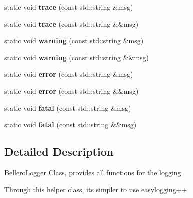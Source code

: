 \begin{DoxyCompactItemize}
$$static void {\bfseries trace} (const std\+::string \&msg)
\item 
\hypertarget{classbellerophon_1_1log_1_1BellerophonLogger_a96aad2634d0c3338abd27f49fbbbe668}{}\label{classbellerophon_1_1log_1_1BellerophonLogger_a96aad2634d0c3338abd27f49fbbbe668} 
static void {\bfseries trace} (const std\+::string \&\&msg)
\item 
\hypertarget{classbellerophon_1_1log_1_1BellerophonLogger_ab7adf7e483d7a4f30a16331a65161efc}{}\label{classbellerophon_1_1log_1_1BellerophonLogger_ab7adf7e483d7a4f30a16331a65161efc} 
static void {\bfseries warning} (const std\+::string \&msg)
\item 
\hypertarget{classbellerophon_1_1log_1_1BellerophonLogger_a5e23b3d06515dc2610660646e6c99f03}{}\label{classbellerophon_1_1log_1_1BellerophonLogger_a5e23b3d06515dc2610660646e6c99f03} 
static void {\bfseries warning} (const std\+::string \&\&msg)
\item 
\hypertarget{classbellerophon_1_1log_1_1BellerophonLogger_a41a6707e911c46c3a78df45730cc6e95}{}\label{classbellerophon_1_1log_1_1BellerophonLogger_a41a6707e911c46c3a78df45730cc6e95} 
static void {\bfseries error} (const std\+::string \&msg)
\item 
\hypertarget{classbellerophon_1_1log_1_1BellerophonLogger_a0586f437126dbc33643e2c71ac1f6b4d}{}\label{classbellerophon_1_1log_1_1BellerophonLogger_a0586f437126dbc33643e2c71ac1f6b4d} 
static void {\bfseries error} (const std\+::string \&\&msg)
\item 
\hypertarget{classbellerophon_1_1log_1_1BellerophonLogger_a6fd49014f6c333644f54aff87b35ec9e}{}\label{classbellerophon_1_1log_1_1BellerophonLogger_a6fd49014f6c333644f54aff87b35ec9e} 
static void {\bfseries fatal} (const std\+::string \&msg)
\item 
\hypertarget{classbellerophon_1_1log_1_1BellerophonLogger_aace4d0e2028aa4464374053c6c558490}{}\label{classbellerophon_1_1log_1_1BellerophonLogger_aace4d0e2028aa4464374053c6c558490} 
static void {\bfseries fatal} (const std\+::string \&\&msg)
\end{DoxyCompactItemize}


\subsection{Detailed Description}
Bellero\+Logger Class, provides all functions for the logging. 

Through this helper class, it\textquotesingle{}s simpler to use easylogging++. 

